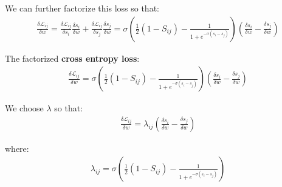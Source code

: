 We can further factorize this loss so that:
\begin{align*}
    \frac{\delta \mathcal{L}_{i j}}{\delta w}=\frac{\delta \mathcal{L}_{i j}}{\delta s_{i}} \frac{\delta s_{i}}{\delta w}+\frac{\delta \mathcal{L}_{i j}}{\delta s_{j}} \frac{\delta s_{j}}{\delta w}=\sigma\left(\frac{1}{2}\left(1-S_{i j}\right)-\frac{1}{1+e^{-\sigma\left(s_{i}-s_{j}\right)}}\right)\left(\frac{\delta s_{i}}{\delta w}-\frac{\delta s_{j}}{\delta w}\right)
\end{align*}

\vspace{0.25cm}

The factorized \textbf{cross entropy loss}:
\begin{align*}
    \frac{\delta \mathcal{L}_{i j}}{\delta w}=\sigma\left(\frac{1}{2}\left(1-S_{i j}\right)-\frac{1}{1+e^{-\sigma\left(s_{i}-s_{j}\right)}}\right)\left(\frac{\delta s_{i}}{\delta w}-\frac{\delta s_{j}}{\delta w}\right)
\end{align*}

We choose $\lambda$ so that:
\begin{align*}
    \frac{\delta \mathcal{L}_{i j}}{\delta w}=\lambda_{i j}\left(\frac{\delta s_{i}}{\delta w}-\frac{\delta s_{j}}{\delta w}\right)
\end{align*}

where:
\begin{align*}
    \lambda_{i j}=\sigma\left(\frac{1}{2}\left(1-S_{i j}\right)-\frac{1}{1+e^{-\sigma\left(s_{i}-s_{j}\right)}}\right)
\end{align*}

